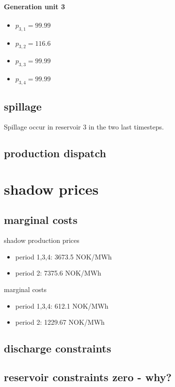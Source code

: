\documentclass{article}
\begin{document}
\paragraph{Generation unit 3}
\begin{itemize}
\item $p_{3,1}=99.99$
\item $p_{3,2}=116.6$
\item $p_{3,3}=99.99$
\item $p_{3,4}=99.99$
\end{itemize}
\subsection{spillage}
Spillage occur in reservoir 3 in the two last timesteps.
\subsection{production dispatch}

\section{shadow prices}
\subsection{marginal costs}
shadow production prices
\begin{itemize}
\item period 1,3,4: 3673.5 NOK/MWh
\item period 2: 7375.6 NOK/MWh
\end{itemize}
marginal costs
\begin{itemize}
\item period 1,3,4: 612.1 NOK/MWh
\item period 2: 1229.67 NOK/MWh
\end{itemize}
\subsection{discharge constraints}

\subsection{reservoir constraints zero - why?}
\end{document}
